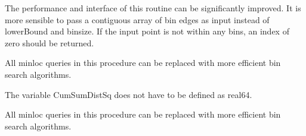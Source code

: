 \begin{DoxyRefList}
%
 The performance and interface of this routine can be significantly improved. It is more sensible to pass a contiguous array of bin edges as input instead of {\ttfamily lower\+Bound} and {\ttfamily binsize}. If the input point is not within any bins, an index of zero should be returned. 
\item[Subprogram \mbox{\hyperlink{namespaceKmeans__mod_ac4b9beeaf1a19b79cfd5aacb8915fb02}{Kmeans\+\_\+mod\+::run\+KPP}} (nc, nd, np, Point, Sum\+Point, Membership, Size, potential)]\label{todo__todo000006}%
%
 All {\ttfamily minloc} queries in this procedure can be replaced with more efficient bin search algorithms.

\label{todo__todo000007}%
%
 The variable {\ttfamily Cum\+Sum\+Dist\+Sq} does not have to be defined as {\ttfamily real64}. 
\item[Subprogram \mbox{\hyperlink{namespaceKmeansOOP__mod_af12decb1817c7b3691239edf3ef79eff}{Kmeans\+OOP\+\_\+mod\+::run\+KPP}} (nc, nd, np, Point, Sum\+Point, Membership, Size, potential)]\label{todo__todo000008}%
%
 All {\ttfamily minloc} queries in this procedure can be replaced with more efficient bin search algorithms.


\end{DoxyRefList}
